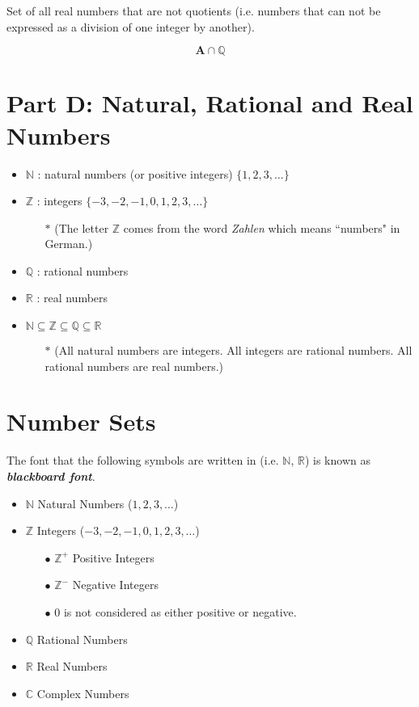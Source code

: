 \documentclass[11pt,a4paper,titlepage,oneside,openany]{article}
\numberwithin{equation}{section}
\numberwithin{algorithm}{section}
\numberwithin{figure}{section}
\numberwithin{table}{section}
\begin{document}
Set of all real numbers that are not quotients (i.e. numbers that can not be expressed as a division of one integer by another).





\[\boldsymbol{A} \cap \mathbb{Q}\]


\section*{Part D: Natural, Rational and Real Numbers}
\begin{framed}
\begin{itemize}
\item $\mathbb{N}$ : natural numbers (or positive integers) $\{1,2,3,\ldots\}$
\item $\mathbb{Z}$ : integers $\{-3,-2,-1,0,1,2,3,\ldots\}$
\begin{itemize}
\item[$\ast$] (The letter $\mathbb{Z}$ comes from the word \emph{Zahlen} which means ``numbers" in German.)
\end{itemize}
\item $\mathbb{Q}$ : rational numbers
\item $\mathbb{R}$ : real numbers
\item $\mathbb{N} \subseteq \mathbb{Z } \subseteq \mathbb{Q} \subseteq \mathbb{R}$
\begin{itemize}
\item[$\ast$] (All natural numbers are integers. All integers are rational numbers. All rational numbers are real numbers.)
\end{itemize}
\end{itemize}
\end{framed}

\section*{Number Sets}
The font that the following symbols are written in (i.e. $\mathbb{N}$, $\mathbb{R}$) is known as \textit{\textbf{blackboard font}}.
\begin{itemize}
	\item $\mathbb{N}$ Natural Numbers ($1,2,3,\ldots$) 
	\item $\mathbb{Z}$ Integers ($-3,-2,-1,0,1,2,3, \ldots$)
	\begin{itemize}
		\item[$\bullet$] $\mathbb{Z}^{+}$ Positive Integers
		\item[$\bullet$] $\mathbb{Z}^{-}$ Negative Integers
		\item[$\bullet$] 0 is not considered as either positive or negative.
	\end{itemize}
	\item $\mathbb{Q}$ Rational Numbers
	\item $\mathbb{R}$ Real Numbers
	\item $\mathbb{C}$ Complex Numbers
\end{itemize}
\end{document}
